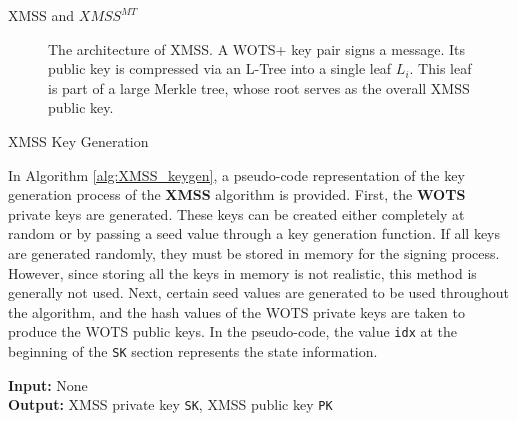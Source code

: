 \documentclass [version=submission]{iacrcc}
\begin{document}
\begin{section}{XMSS and \texorpdfstring{$XMSS^{MT}$}{XMSS MT}}
\begin{figure}[h]
\caption{The architecture of XMSS. A WOTS+ key pair signs a message. Its public key is compressed via an L-Tree into a single leaf $L_i$. This leaf is part of a large Merkle tree, whose root serves as the overall XMSS public key.}
\label{fig:xmss}
\end{figure}


    \begin{subsection}{XMSS Key Generation}

        In Algorithm \ref{alg:XMSS_keygen}, a pseudo-code representation of the key generation process of the \textbf{XMSS} algorithm is provided. First, the \textbf{WOTS} private keys are generated. These keys can be created either completely at random or by passing a seed value through a key generation function. If all keys are generated randomly, they must be stored in memory for the signing process. However, since storing all the keys in memory is not realistic, this method is generally not used. Next, certain seed values are generated to be used throughout the algorithm, and the hash values of the WOTS private keys are taken to produce the WOTS public keys. In the pseudo-code, the value \texttt{idx} at the beginning of the \texttt{SK} section represents the state information.

        \begin{algorithm}
\caption{XMSS\_keyGen -- Generate an XMSS key pair}
\label{alg:XMSS_keygen}

\textbf{Input:} None \\
\textbf{Output:} XMSS private key \texttt{SK}, XMSS public key \texttt{PK}

\vspace{0.3cm}


\end{algorithm}
\end{subsection}
\end{section}
\end{document}
